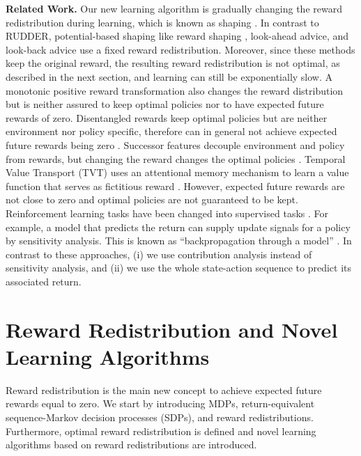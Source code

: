 \documentclass{article}
\begin{document}
{\bf Related Work.}
Our new learning algorithm is gradually changing 
the reward redistribution during learning, 
which is known as shaping \cite{Skinner:58,Sutton:18book}.
In contrast to RUDDER, potential-based shaping like 
reward shaping \cite{Ng:99}, look-ahead advice, and
look-back advice \cite{Wiewiora:03icml} use a fixed reward redistribution. 
Moreover, since these methods keep the original reward, 
the resulting reward redistribution is not optimal,
as described in the next section,
and learning can still be exponentially slow. 
A monotonic positive reward transformation \cite{Peters:07}
also changes the reward distribution but is neither assured 
to keep optimal policies nor to have expected future rewards of zero.
Disentangled rewards keep optimal policies but are neither environment 
nor policy specific, therefore can in general not achieve 
expected future rewards being zero \cite{Fu:18}.
Successor features decouple environment and policy 
from rewards, but changing the reward changes the  
optimal policies \cite{Barreto:17,Barreto:18}. 
Temporal Value Transport (TVT) uses 
an attentional memory mechanism to learn
a value function that serves as
fictitious reward \cite{Hung:18}. 
However, expected future rewards are not close to zero
and optimal policies are not guaranteed to be kept.
Reinforcement learning tasks have been changed
into supervised tasks \cite{Schaal:99,Barto:04,Schmidhuber:15}. 
For example, a model that predicts the return can supply update 
signals for a policy by sensitivity analysis. 
This is known as ``backpropagation through a model''  \cite{Munro:87,Robinson:89,RobinsonFallside:89,Werbos:90,Schmidhuber:91nips,Bakker:02,Bakker:07}.
In contrast to these approaches, 
(i) we use contribution analysis instead of 
sensitivity analysis,
and (ii) we use the whole state-action sequence to predict its
associated return.


\section{Reward Redistribution and Novel Learning Algorithms}


Reward redistribution is the main new concept
to achieve expected future rewards equal to zero.
We start by introducing MDPs,  
return-equivalent sequence-Markov decision processes (SDPs),
and reward redistributions.
Furthermore, optimal reward redistribution is defined and
novel learning algorithms based on reward redistributions 
are introduced.
\end{document}
